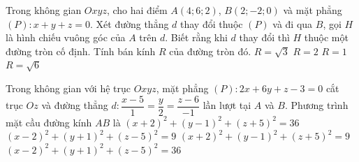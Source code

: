 \begin{ex}%
	Trong không gian $Oxyz$, cho hai điểm $A(4;6;2)$, $B(2;-2;0)$ và mặt phẳng $(P)\colon x+y+z=0$. Xét đường thẳng $d$ thay đổi thuộc $(P)$ và đi qua $B$, gọi $H$ là hình chiếu vuông góc của $A$ trên $d$. Biết rằng khi $d$ thay đổi thì $H$ thuộc một đường tròn cố định. Tính bán kính $R$ của đường tròn đó.
	\choice 
		{$R=\sqrt{3}$}
		{$R=2$}
		{$R=1$}
		{\True $R=\sqrt{6}$}
\end{ex}

\begin{ex}%
	Trong không gian với hệ trục $Oxyz$, mặt phẳng $(P)\colon 2x+6y+z-3=0$ cắt trục $Oz$ và đường thẳng $d\colon \dfrac{x-5}{1}=\dfrac{y}{2}=\dfrac{z-6}{-1}$ lần lượt tại $A$ và $B$. Phương trình mặt cầu đường kính $AB$ là
	\choice 						
		{$(x+2)^2+(y-1)^2+(z+5)^2=36$}
		{\True $(x-2)^2+(y+1)^2+(z-5)^2=9$}
		{$(x+2)^2+(y-1)^2+(z+5)^2=9$}
		{$(x-2)^2+(y+1)^2+(z-5)^2=36$}
\end{ex}

